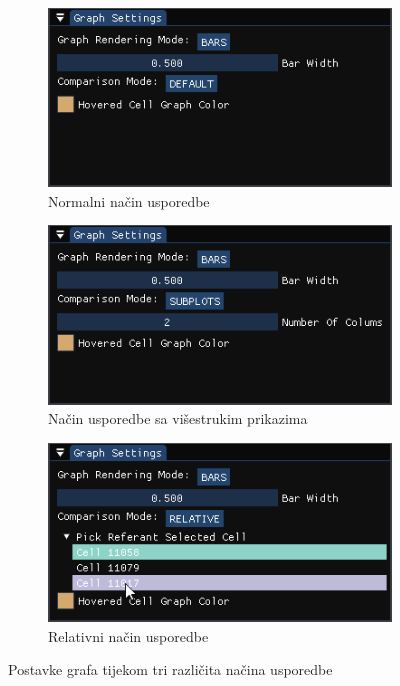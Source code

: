 \documentclass[times, utf8, diplomski]{fer}
\begin{document}
\begin{figure} [H]
     \centering
     \begin{subfigure}[h]{0.48\textwidth}
         \centering
         \includegraphics[width=\textwidth]{graph_settings_default.png}
         \caption{Normalni način usporedbe}
         \label{fig:graph-settings-normal-mode}
     \end{subfigure}
     \hfill
     \begin{subfigure}[h]{0.48\textwidth}
         \centering
         \includegraphics[width=\textwidth]{graph_settings_subplots.png}
         \caption{Način usporedbe sa višestrukim prikazima}
         \label{fig:graph-settings-limits-mode}
     \end{subfigure}
     \hfill
     \begin{subfigure}[h]{0.48\textwidth}
         \centering
         \includegraphics[width=\textwidth]{graph_settings_relative.png}
         \caption{Relativni način usporedbe}
         \label{fig:graph-settings-limits-mode}
     \end{subfigure}
     \caption{Postavke grafa tijekom tri različita načina usporedbe}
     \label{fig:graph-settings-3-modes}
\end{figure}
\end{document}
